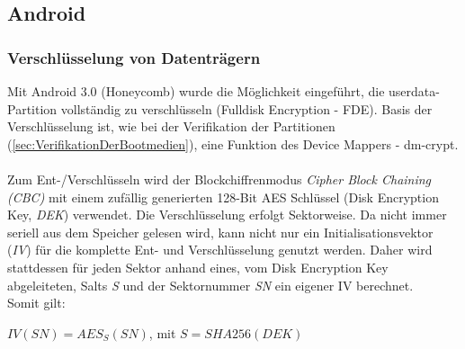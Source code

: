 \subsection{Android}
	\subsubsection{Verschlüsselung von Datenträgern}
	Mit Android 3.0 (Honeycomb) wurde die Möglichkeit eingeführt, die userdata-Partition vollständig zu verschlüsseln (Fulldisk Encryption - FDE). Basis der Verschlüsselung ist, wie bei der Verifikation der Partitionen (\ref{sec:VerifikationDerBootmedien}), eine Funktion des Device Mappers - dm-crypt.\\\\
	Zum Ent-/Verschlüsseln wird der Blockchiffrenmodus \textit{Cipher Block Chaining (CBC)} mit einem zufällig generierten 128-Bit AES Schlüssel (Disk Encryption Key, \textit{DEK}) verwendet. Die Verschlüsselung erfolgt Sektorweise. Da nicht immer seriell aus dem Speicher gelesen wird, kann nicht nur ein Initialisationsvektor (\textit{IV}) für die komplette Ent- und Verschlüsselung genutzt werden. Daher wird stattdessen für jeden Sektor anhand eines, vom Disk Encryption Key abgeleiteten, Salts \textit{S} und der Sektornummer \textit{SN} ein eigener IV berechnet.\\
	Somit gilt:
\begin{center}
	\begin{math}
	IV(SN) = AES_{S}(SN)\end{math}, mit \begin{math}S = SHA256(DEK)
	\end{math}
\end{center}
